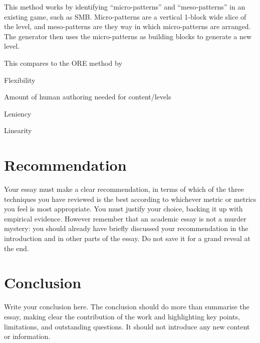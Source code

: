 \documentclass{scrartcl}
\begin{document}
This method works by identifying ``micro-patterns'' and ``meso-patterns'' in an existing game, such as SMB. Micro-patterns are a vertical 1-block wide slice of the level, and meso-patterns are they way in which micro-patterns are arranged. The generator then uses the micro-patterns as building blocks to generate a new level.

This compares to the ORE method by 



\subtitle{comparisons}

Flexibility

Amount of human authoring needed for content/levels

Leniency

Linearity






\section{Recommendation}

Your essay must make a clear recommendation, in terms of which of the three techniques you have reviewed is the best according to whichever metric or metrics you feel is most appropriate. You must justify your choice, backing it up with empirical evidence. However remember that an academic essay is not a murder mystery: you should already have briefly discussed your recommendation in the introduction and in other parts of the essay. Do not save it for a grand reveal at the end.

\section{Conclusion}

Write your conclusion here. The conclusion should do more than summarise the essay, making clear the contribution of the work and highlighting key points, limitations, and outstanding questions. It should not introduce any new content or information.



\end{document}
